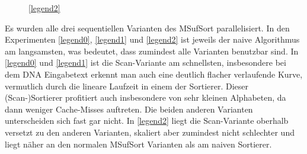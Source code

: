 \begin{figure}[ht]

    \medskip
    \ref{legend2}
\end{figure}
\FloatBarrier

Es wurden alle drei sequentiellen Varianten des MSufSort parallelisiert. In den Experimenten \ref{legend0}, \ref{legend1} und \ref{legend2} ist jeweils der naive Algorithmus am langsamsten, was bedeutet, dass zumindest alle Varianten benutzbar sind. In \ref{legend0} und \ref{legend1} ist die Scan-Variante am schnellsten, insbesondere bei dem DNA Eingabetext erkennt man auch eine deutlich flacher verlaufende Kurve, vermutlich durch die lineare Laufzeit in einem der Sortierer. Dieser (Scan-)Sortierer profitiert auch insbesondere von sehr kleinen Alphabeten, da dann weniger Cache-Misses auftreten. Die beiden anderen Varianten unterscheiden sich fast gar nicht. In \ref{legend2} liegt die Scan-Variante oberhalb versetzt zu den anderen Varianten, skaliert aber zumindest nicht schlechter und liegt näher an den normalen MSufSort Varianten als am naiven Sortierer.